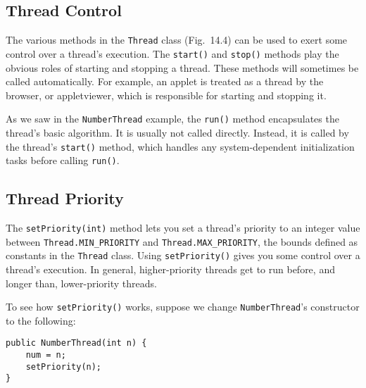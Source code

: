 \subsection{Thread Control}
\noindent The various methods in the {\tt Thread} class (Fig.~14.4)
can be used to exert
some control over a thread's execution.  The {\tt start()} and
{\tt stop()} methods play the obvious roles of starting and stopping a
thread.  These methods will sometimes be called automatically.
For example, an applet is treated as a thread by the browser,
or appletviewer, which is responsible for starting and stopping it.

As we saw in the {\tt NumberThread} example, the {\tt run()} method
encapsulates the thread's basic algorithm.   It is usually not called
directly.  Instead, it is called by the thread's {\tt start()} method,
which handles any system-dependent initialization tasks before calling
{\tt run()}.

\subsection{Thread Priority}
\noindent The {\tt setPriority(int)} method lets you set a thread's priority to
an integer value between {\tt Thread.MIN\_PRIORITY} and
{\tt Thread.MAX\_PRIOR\-ITY}, the bounds defined as constants in the
{\tt Thread} class.  Using {\tt set\-Prior\-ity()} gives you some control over a
thread's execution.  In general, higher-priority threads get to run
before, and longer than, lower-priority threads.


\noindent To see how {\tt setPriority()} works, suppose we change
{\tt NumberThread}'s constructor to the following:

\begin{jjjlisting}
\begin{lstlisting}
public NumberThread(int n) {
    num = n;
    setPriority(n);
}
\end{lstlisting}
\end{jjjlisting}

